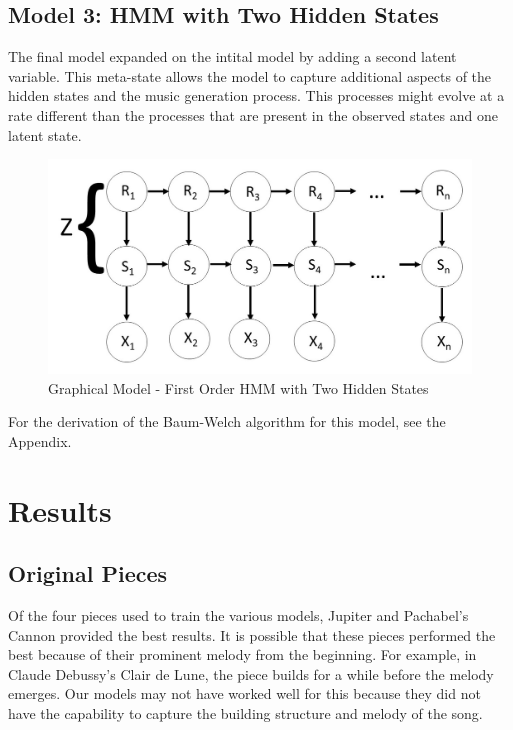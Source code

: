 \documentclass{article} %
\begin{document}
\subsection{Model 3: HMM with Two Hidden States}

The final model expanded on the intital model by adding a second latent variable. This meta-state allows the model to capture additional aspects of the hidden states and the music generation process.  This processes might evolve at a rate different than the processes that are present in the observed states and one latent state. 

\begin{figure}[H]
\centering
\caption{Graphical Model - First Order HMM with Two Hidden States}
\includegraphics [scale = 0.35] {Model3.jpg}
\end{figure}

For the derivation of the Baum-Welch algorithm for this model, see the Appendix.

\section{Results}

\subsection{Original Pieces}

Of the four pieces used to train the various models, Jupiter and Pachabel's Cannon provided the best results. It is possible that these pieces performed the best because of their prominent melody from the beginning. For example, in Claude Debussy's Clair de Lune, the piece builds for a while before the melody emerges. Our models may not have worked well for this because they did not have the capability to capture the building structure and melody of the song. 
\end{document}
